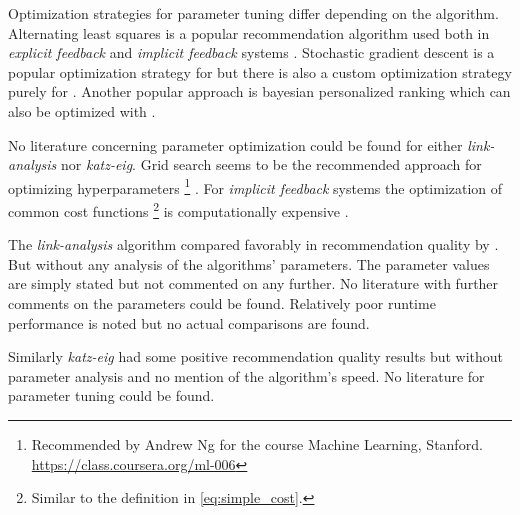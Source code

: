 Optimization strategies for parameter tuning differ depending on the algorithm.  Alternating least squares \pals is a popular recommendation algorithm used both in \textit{explicit feedback} and \textit{implicit feedback} systems \citep{hu2008collaborative, takacs2012alternating}. Stochastic gradient descent \psgd is a popular optimization strategy for \als \citep{hu2008collaborative, takacs2012alternating} but there is also a custom optimization strategy purely for \als \citep{takacs2012alternating}. Another popular approach is bayesian personalized ranking which can also be optimized with \sgd \citep{rendle2009bpr}.

No literature concerning parameter optimization could be found for either \textit{link-analysis} nor \textit{katz-eig}.  Grid search seems to be the recommended approach for optimizing hyperparameters
\footnote{Recommended by Andrew Ng for the course Machine Learning, Stanford. \url{https://class.coursera.org/ml-006}}
. For \textit{implicit feedback} systems the optimization of common cost functions
\footnote{Similar to the definition in \eqref{eq:simple_cost}.}
is computationally expensive \citep{takacs2012alternating}.

The \textit{link-analysis} algorithm compared favorably in recommendation quality by \citep{huang2007comparison}. But without any analysis of the algorithms' parameters. The parameter values are simply stated but not commented on any further. No literature with further comments on the parameters could be found. Relatively poor runtime performance is noted \citep{huang2004link} but no actual comparisons are found.

Similarly \textit{katz-eig} had some positive recommendation quality results \citep{shin2012multi} but without parameter analysis and no mention of the algorithm's speed. No literature for parameter tuning could be found.






